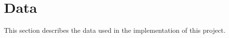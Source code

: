 \section{Data}\label{sec:impl-data}
This section describes the data used in the implementation of this project.



